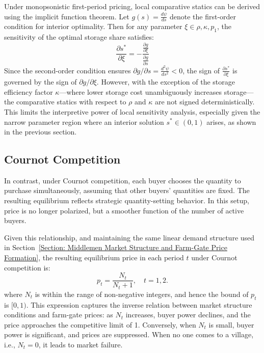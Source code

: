 Under monopsonistic first-period pricing, local comparative statics can be derived using the implicit function theorem. Let $g(s) = \frac{d\psi}{ds}$ denote the first-order condition for interior optimality. Then for any parameter $\xi \in {\rho, \kappa, p_1}$, the sensitivity of the optimal storage share satisfies:
$$
\frac{\partial s^*}{\partial \xi}= -\frac{\frac{\partial g}{\partial \xi}}{\frac{\partial g}{\partial s}}
$$
Since the second-order condition ensures $\partial g / \partial s = \frac{d^2\psi}{ds^2} < 0$, the sign of $\frac{\partial s^*}{\partial \xi}$ is governed by the sign of $\partial g / \partial \xi$. However, with the exception of the storage efficiency factor $\kappa$—where lower storage cost unambiguously increases storage—the comparative statics with respect to $\rho$ and $\kappa$ are not signed deterministically. This limits the interpretive power of local sensitivity analysis, especially given the narrow parameter region where an interior solution $s^* \in (0,1)$ arises, as shown in the previous section.







\subsection{Cournot Competition}
\noindent In contrast, under Cournot competition, each buyer chooses the quantity to purchase simultaneously, assuming that other buyers’ quantities are fixed. The resulting equilibrium reflects strategic quantity-setting behavior. In this setup, price is no longer polarized, but a smoother function of the number of active buyers.

Given this relationship, and maintaining the same linear demand structure used in Section~\ref{Section: Middlemen Market Structure and Farm-Gate Price Formation}, the resulting equilibrium price in each period $t$ under Cournot competition is:
\begin{equation}
    p_t = \frac{N_t}{N_t + 1}, \quad t = 1,2.
\end{equation}
where $N_t$ is within the range of non-negative integers, and hence the bound of $p_t$ is $[0, 1)$. This expression captures the inverse relation between market structure conditions and farm-gate prices: as $N_t$ increases, buyer power declines, and the price approaches the competitive limit of 1. Conversely, when $N_t$ is small, buyer power is significant, and prices are suppressed. When no one comes to a village, i.e., $N_t=0$, it leads to market failure. 


